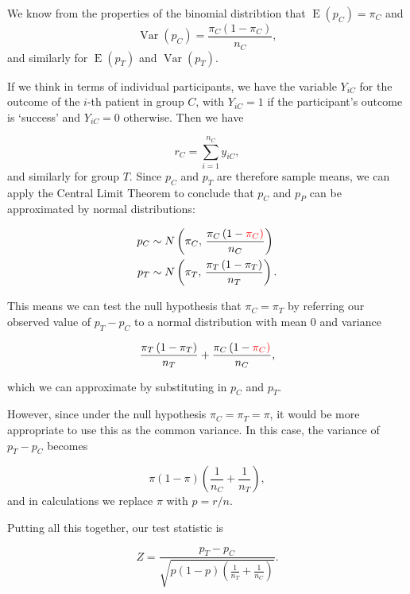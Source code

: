\documentclass[
  openany]{book}
\theoremstyle{definition}
\theoremstyle{definition}
\theoremstyle{definition}
\theoremstyle{definition}
\theoremstyle{remark}
\begin{document}
We know from the properties of the binomial distribtion that \(\operatorname{E}\left(p_C\right) = \pi_C\) and
\[\operatorname{Var}\left(p_C\right) = \frac{\pi_C\left(1-\pi_C\right)}{n_C},\]
and similarly for \(\operatorname{E}\left(p_T\right)\) and \(\operatorname{Var}\left(p_T\right)\).

If we think in terms of individual participants, we have the variable \(Y_{iC}\) for the outcome of the \(i\)-th patient in group \(C\), with \(Y_{iC}=1\) if the participant's outcome is `success' and \(Y_{iC}=0\) otherwise. Then we have

\[r_C = \sum\limits_{i=1}^{n_C} y_{iC},\]
and similarly for group \(T\). Since \(p_C\) and \(p_T\) are therefore sample means, we can apply the Central Limit Theorem to conclude that \(p_C\) and \(p_P\) can be approximated by normal distributions:

\[
\begin{aligned}
p_C & \sim N\left(\pi_C,\, \frac{\pi_C\left(1-\color{red}{\pi_C}\right)}{n_C}\right)\\
p_T & \sim N\left(\pi_T,\, \frac{\pi_T\left(1-\pi_T\right)}{n_T}\right).
\end{aligned}
\]

This means we can test the null hypothesis that \(\pi_C = \pi_T\) by referring our observed value of \(p_T - p_C\) to a normal distribution with mean 0 and variance

\[ \frac{\pi_T\left(1-\pi_T\right)}{n_T} + \frac{\pi_C\left(1-\color{red}{\pi_C}\right)}{n_C},\]

which we can approximate by substituting in \(p_C\) and \(p_T\).

However, since under the null hypothesis \(\pi_C = \pi_T = \pi\), it would be more appropriate to use this as the common variance. In this case, the variance of \(p_T - p_C\) becomes

\[\pi\left(1-\pi\right)\left(\frac{1}{n_C} + \frac{1}{n_T}\right), \]
and in calculations we replace \(\pi\) with \(p = r/n\).

Putting all this together, our test statistic is

\[Z = \frac{p_T - p_C}{\sqrt{p\left(1-p\right)\left(\frac{1}{n_T} + \frac{1}{n_C}\right)}}.\]
\end{document}
